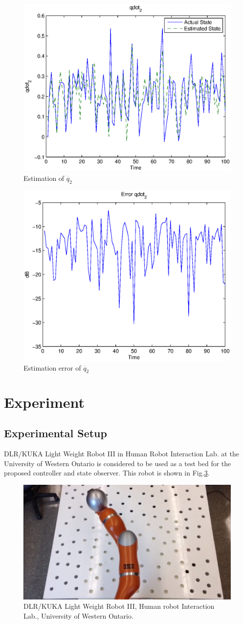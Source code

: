 \documentclass[conference]{IEEEtran}
\begin{document}
\begin{figure}
\centering
\includegraphics[width=.4 \textwidth]{qdot2.eps}
\caption{Estimation of $\dot{q_2}$}
\label{qdot2}
\end{figure}

\begin{figure}
\centering
\includegraphics[width=.4 \textwidth]{qdot2error.eps}
\caption{Estimation error of $\dot{q_2}$}
\label{qdot2error}
\end{figure}
\section{Experiment}

\subsection{Experimental Setup}
DLR/KUKA Light Weight Robot III in Human Robot Interaction Lab. at the
University of Western Ontario is considered to be used as a test bed for the
proposed controller and state observer. This robot is shown in
Fig.\ref{kukasetup}.
\begin{figure}
\centering
\includegraphics[width=.4 \textwidth]{experimentalSetup.png}
\caption{DLR/KUKA Light Weight Robot III, Human robot Interaction Lab.,
University of Western Ontario.}
\label{kukasetup}
\end{figure}
\end{document}
